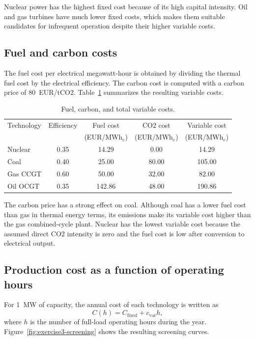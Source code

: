 \documentclass[a4paper]{report}
\begin{document}
Nuclear power has the highest fixed cost because of its high capital intensity. Oil and gas turbines have much lower fixed costs, which makes them suitable candidates for infrequent operation despite their higher variable costs.

\subsection{Fuel and carbon costs}

The fuel cost per electrical megawatt-hour is obtained by dividing the thermal fuel cost by the electrical efficiency. The carbon cost is computed with a carbon price of \SI{80}{EUR/tCO2}. Table~\ref{tab:exercise3-variable-costs} summarizes the resulting variable costs.

\begin{table}[H]
  \centering
  \caption{Fuel, carbon, and total variable costs.}
  \label{tab:exercise3-variable-costs}
  \begin{tabular}{lcccc}
    \toprule
    Technology & Efficiency & Fuel cost & CO2 cost & Variable cost \\
    & & (EUR/MWh$_e$) & (EUR/MWh$_e$) & (EUR/MWh$_e$) \\
    \midrule
    Nuclear & 0.35 & 14.29 & 0.00 & 14.29 \\
    Coal & 0.40 & 25.00 & 80.00 & 105.00 \\
    Gas CCGT & 0.60 & 50.00 & 32.00 & 82.00 \\
    Oil OCGT & 0.35 & 142.86 & 48.00 & 190.86 \\
    \bottomrule
  \end{tabular}
\end{table}

The carbon price has a strong effect on coal. Although coal has a lower fuel cost than gas in thermal energy terms, its emissions make its variable cost higher than the gas combined-cycle plant. Nuclear has the lowest variable cost because the assumed direct CO2 intensity is zero and the fuel cost is low after conversion to electrical output.

\subsection{Production cost as a function of operating hours}

For \SI{1}{\mega\watt} of capacity, the annual cost of each technology is written as
\[
C(h) = C_{\mathrm{fixed}} + c_{\mathrm{var}} h,
\]
where \(h\) is the number of full-load operating hours during the year. Figure~\ref{fig:exercise3-screening} shows the resulting screening curves.
\end{document}

